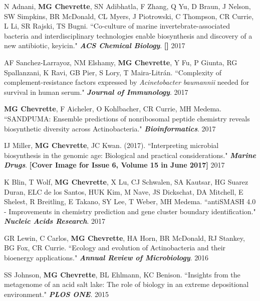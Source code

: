 \begin{cvpubs}
\cvpub
{N Adnani, \textbf{MG Chevrette}, SN Adibhatla, F Zhang, Q Yu, D Braun, J Nelson, SW Simpkins, BR McDonald, CL Myers, J Piotrowski, C Thompson, CR Currie, L Li, SR Rajski, TS Bugni. ``Co-culture of marine invertebrate-associated bacteria and interdisciplinary technologies enable biosynthesis and discovery of a new antibiotic, keyicin." \textit{\textbf{ACS Chemical Biology}}.  \textbf{\textit{}} \linebreak \textbf{[\textit{}]}}
{2017}

\cvpub
{AF Sanchez-Larrayoz, NM Elshamy, \textbf{MG Chevrette}, Y Fu, P Giunta, RG Spallanzani, K Ravi, GB Pier, S Lory, T Maira-Litr\'{a}n. ``Complexity of complement-resistance factors expressed by \textit{Acinetobacter baumannii} needed for survival in human serum." \textit{\textbf{Journal of Immunology}}. \textbf{\textit{}}}
{2017}

\cvpub
{\textbf{MG Chevrette}, F Aicheler, O Kohlbacher, CR Currie, MH Medema. ``SANDPUMA: Ensemble predictions of nonribosomal peptide chemistry reveals biosynthetic diversity across Actinobacteria." \textit{\textbf{Bioinformatics}}. \textbf{\textit{}}}
{2017}

\cvpub
{IJ Miller, \textbf{MG Chevrette}, JC Kwan. (2017). ``Interpreting microbial biosynthesis in the genomic age: Biological and practical considerations." \textit{\textbf{Marine Drugs}}. \textbf{\textit{}} \linebreak \textbf{[Cover Image for Issue 6, Volume 15 in June 2017]}}
{2017}

\cvpub
{K Blin, T Wolf, \textbf{MG Chevrette}, X Lu, CJ Schwalen, SA Kautsar, HG Suarez Duran, ELC de los Santos, HUK Kim, M Nave, JS Dickschat, DA Mitchell, E Shelest, R Breitling, E Takano, SY Lee, T Weber, MH Medema. ``antiSMASH 4.0 - Improvements in chemistry prediction and gene cluster boundary identification." \textit{\textbf{Nucleic Acids Research}}. \textbf{\textit{}}}
{2017}

\cvpub
{GR Lewin, C Carlos, \textbf{MG Chevrette}, HA Horn, BR McDonald, RJ Stankey, BG Fox, CR Currie. ``Ecology and evolution of Actinobacteria and their bioenergy applications." \textit{\textbf{Annual Review of Microbiology}}. \textbf{\textit{}}}
{2016}

\cvpub
{SS Johnson, \textbf{MG Chevrette}, BL Ehlmann, KC Benison. ``Insights from the metagenome of an acid salt lake: The role of biology in an extreme depositional environment."  \textit{\textbf{PLOS ONE}}. \textbf{\textit{}}}
{2015}

\end{cvpubs}

